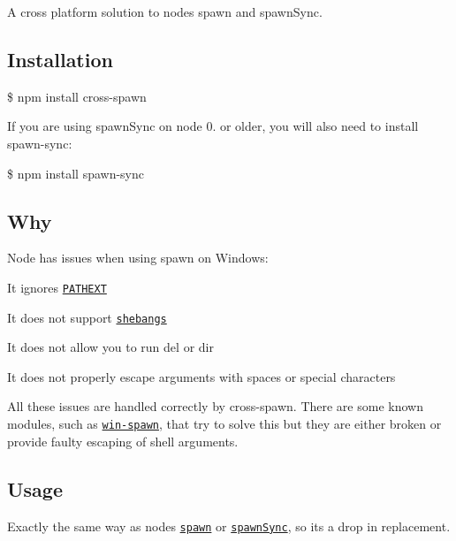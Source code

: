 \href{https://npmjs.org/package/cross-spawn}{\tt } \href{https://npmjs.org/package/cross-spawn}{\tt } \href{https://travis-ci.org/IndigoUnited/node-cross-spawn}{\tt } \href{https://ci.appveyor.com/project/satazor/node-cross-spawn}{\tt } \href{https://david-dm.org/IndigoUnited/node-cross-spawn}{\tt } \href{https://david-dm.org/IndigoUnited/node-cross-spawn#info=devDependencies}{\tt }

A cross platform solution to node\textquotesingle{}s spawn and spawn\+Sync.

\subsection*{Installation}

{\ttfamily \$ npm install cross-\/spawn}

If you are using {\ttfamily spawn\+Sync} on node 0. or older, you will also need to install {\ttfamily spawn-\/sync}\+:

{\ttfamily \$ npm install spawn-\/sync}

\subsection*{Why}

Node has issues when using spawn on Windows\+:


\begin{DoxyItemize}
\item It ignores \href{https://github.com/joyent/node/issues/2318}{\tt P\+A\+T\+H\+E\+XT}
\item It does not support \href{http://pt.wikipedia.org/wiki/Shebang}{\tt shebangs}
\item It does not allow you to run {\ttfamily del} or {\ttfamily dir}
\item It does not properly escape arguments with spaces or special characters
\end{DoxyItemize}

All these issues are handled correctly by {\ttfamily cross-\/spawn}. There are some known modules, such as \href{https://github.com/ForbesLindesay/win-spawn}{\tt win-\/spawn}, that try to solve this but they are either broken or provide faulty escaping of shell arguments.

\subsection*{Usage}

Exactly the same way as node\textquotesingle{}s \href{https://nodejs.org/api/child_process.html#child_process_child_process_spawn_command_args_options}{\tt {\ttfamily spawn}} or \href{https://nodejs.org/api/child_process.html#child_process_child_process_spawnsync_command_args_options}{\tt {\ttfamily spawn\+Sync}}, so it\textquotesingle{}s a drop in replacement.


